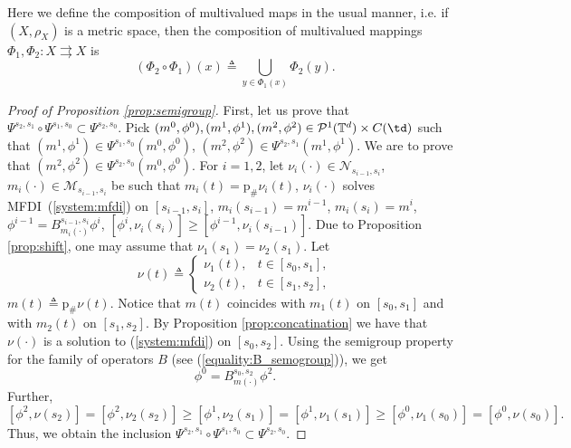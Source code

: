 \documentclass[a4paper,12pt]{article}
\newcommand{\ptd}{\mathcal{P}^1(\mathbb{T}^d)}
\begin{document}
Here we define the composition of multivalued maps in the usual manner, i.e. if $(X,\rho_X)$ is a metric space, then  the composition of multivalued mappings $\Phi_1,\Phi_2:X\rightrightarrows X$ is 
$$(\Phi_2\circ\Phi_1)(x)\triangleq \bigcup_{y\in \Phi_1(x)}\Phi_2(y).$$ 
\begin{proof}[Proof of Proposition \ref{prop:semigroup}]
	First, let us prove that $\Psi^{s_2,s_1}\circ\Psi^{s_1,s_0}\subset \Psi^{s_2,s_0}$.  Pick $(m^0,\phi^0),(m^1,\phi^1),(m^2,\phi^2)\in\ptd\times C(\td)$ such that
	$(m^1,\phi^1)\in \Psi^{s_1,s_0}(m^0,\phi^0)$, $(m^2,\phi^2)\in \Psi^{s_2,s_1}(m^1,\phi^1)$. We are to prove that $(m^2,\phi^2)\in \Psi^{s_2,s_0}(m^0,\phi^0)$. For $i=1,2$, let $\nu_i(\cdot)\in\mathcal{N}_{s_{i-1},s_i}$, $m_i(\cdot)\in\mathcal{M}_{s_{i-1},s_{i}}$ be such that
	$m_i(t)=\mathrm{p}_\# \nu_i(t)$, $\nu_i(\cdot)$ solves MFDI~(\ref{system:mfdi}) on $[s_{i-1},s_i]$, $m_i(s_{i-1})=m^{i-1}$, $m_i(s_i)=m^i$, $\phi^{i-1}=B^{s_{i-1},s_{i}}_{m_i(\cdot)}\phi^{i}$, $[\phi^i,\nu_i(s_i)]\geq [\phi^{i-1},\nu_i(s_{i-1})]$. Due to Proposition \ref{prop:shift}, one may assume that $\nu_1(s_1)=\nu_2(s_1)$. Let 
	$$\nu(t)\triangleq\left\{\begin{array}{cc}
	\nu_1(t), & t\in [s_0,s_1],\\
	\nu_2(t), & t\in [s_1,s_2],
	\end{array}
	\right. $$
	$m(t)\triangleq \mathrm{p}_\#\nu(t)$. Notice that $m(t)$ coincides with $m_1(t)$ on $[s_0,s_1]$ and with $m_2(t)$ on $[s_1,s_2]$. By Proposition \ref{prop:concatination} we have that $\nu(\cdot)$ is a solution to (\ref{system:mfdi}) on $[s_0,s_2]$. Using the semigroup property for the family of operators $B$ (see (\ref{equality:B_semogroup})), we get
	$$\phi^0=B^{s_0,s_2}_{m(\cdot)}\phi^2. $$ Further, $$[\phi^2,\nu(s_2)]=[\phi^2,\nu_2(s_2)]\geq  [\phi^1,\nu_2(s_1)]=[\phi^1,\nu_1(s_1)]\geq [\phi^0,\nu_1(s_0)]=[\phi^0,\nu(s_0)].$$
	Thus, we obtain the inclusion $\Psi^{s_2,s_1}\circ\Psi^{s_1,s_0}\subset \Psi^{s_2,s_0}$.
	

\end{proof}
\end{document}
